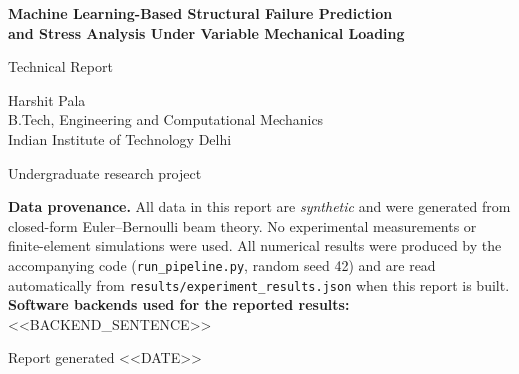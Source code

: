\documentclass[11pt,a4paper]{article}
\begin{document}
\begin{titlepage}
\centering
\vspace*{2.5cm}
{\LARGE\bfseries Machine Learning-Based Structural Failure Prediction\\[4pt] and Stress Analysis Under Variable Mechanical Loading\par}
\vspace{1.2cm}
{\large Technical Report\par}
\vspace{0.6cm}
{\large Harshit Pala\\ B.Tech, Engineering and Computational Mechanics\\ Indian Institute of Technology Delhi\par}
\vspace{1.2cm}
{\normalsize Undergraduate research project\par}
\vfill
\begin{minipage}{0.86\textwidth}\small
\textbf{Data provenance.} All data in this report are \emph{synthetic} and were generated from closed-form
Euler--Bernoulli beam theory. No experimental measurements or finite-element simulations were used. All numerical
results were produced by the accompanying code (\texttt{run\_pipeline.py}, random seed 42) and are read
automatically from \texttt{results/experiment\_results.json} when this report is built.\\[4pt]
\textbf{Software backends used for the reported results:} <<BACKEND_SENTENCE>>
\end{minipage}
\vspace{1cm}

{\small Report generated <<DATE>>\par}
\end{titlepage}

\tableofcontents
\newpage
\end{document}
